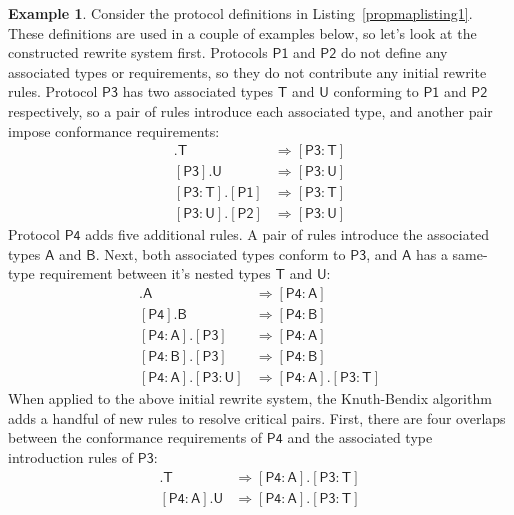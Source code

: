 \documentclass[a4paper,headsepline,bibliography=totoc,toc=flat,fleqn,twoside=semi]{scrbook}
\theoremstyle{definition}
\theoremstyle{definition}
\newtheorem{example}{Example}[chapter]
\theoremstyle{definition}
\newcommand{\namesym}[1]{\mathsf{#1}}
\newcommand{\proto}[1]{\bm{\mathsf{#1}}}
\newcommand{\protosym}[1]{[\proto{#1}]}
\newcommand{\assocsym}[2]{[\proto{#1}\colon\namesym{#2}]}
\begin{document}
\begin{example}\label{propmapexample1}
Consider the protocol definitions in Listing~\ref{propmaplisting1}. These definitions are used in a couple of examples below, so let's look at the constructed rewrite system first. Protocols $\proto{P1}$ and $\proto{P2}$ do not define any associated types or requirements, so they do not contribute any initial rewrite rules. Protocol $\proto{P3}$ has two associated types $\namesym{T}$ and $\namesym{U}$ conforming to $\proto{P1}$ and $\proto{P2}$ respectively, so a pair of rules introduce each associated type, and another pair impose conformance requirements:
\begin{align}
\protosym{P3}.\namesym{T}&\Rightarrow\assocsym{P3}{T}\tag{1}\\
\protosym{P3}.\namesym{U}&\Rightarrow\assocsym{P3}{U}\tag{2}\\
\assocsym{P3}{T}.\protosym{P1}&\Rightarrow\assocsym{P3}{T}\tag{3}\\
\assocsym{P3}{U}.\protosym{P2}&\Rightarrow\assocsym{P3}{U}\tag{4}
\end{align}
Protocol $\proto{P4}$ adds five additional rules. A pair of rules introduce the associated types $\namesym{A}$ and $\namesym{B}$. Next, both associated types conform to $\proto{P3}$, and $\namesym{A}$ has a same-type requirement between it's nested types $\namesym{T}$ and $\namesym{U}$:
\begin{align}
\protosym{P4}.\namesym{A}&\Rightarrow\assocsym{P4}{A}\tag{5}\\
\protosym{P4}.\namesym{B}&\Rightarrow\assocsym{P4}{B}\tag{6}\\
\assocsym{P4}{A}.\protosym{P3}&\Rightarrow\assocsym{P4}{A}\tag{7}\\
\assocsym{P4}{B}.\protosym{P3}&\Rightarrow\assocsym{P4}{B}\tag{8}\\
\assocsym{P4}{A}.\assocsym{P3}{U}&\Rightarrow\assocsym{P4}{A}.\assocsym{P3}{T}\tag{9}
\end{align}
When applied to the above initial rewrite system, the Knuth-Bendix algorithm adds a handful of new rules to resolve critical pairs. First, there are four overlaps between the conformance requirements of $\proto{P4}$ and the associated type introduction rules of $\proto{P3}$:
\begin{align}
\assocsym{P4}{A}.\namesym{T}&\Rightarrow\assocsym{P4}{A}.\assocsym{P3}{T}\tag{10}\\
\assocsym{P4}{A}.\namesym{U}&\Rightarrow\assocsym{P4}{A}.\assocsym{P3}{T}\tag{11}\\

\end{align}
\end{example}
\end{document}
